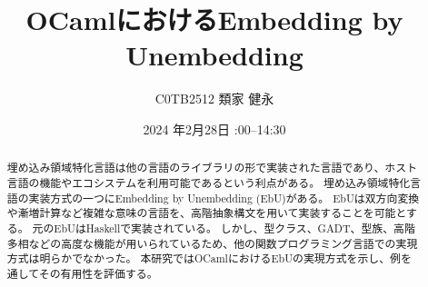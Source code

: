 \documentclass[uplatex]{sumiilab-paper}
\title{OCamlにおけるEmbedding by Unembedding}
\author{C0TB2512 類家 健永}
\institute{東北大学 工学部\\電気情報物理工学科}%
\date{2024 年2月28日 \quad 14:00--14:30}
\theoremstyle{mystyle}
\numberwithin{definition}{chapter} %
\begin{document}
\frontmatter%

\maketitle

\begin{abstract}
埋め込み領域特化言語は他の言語のライブラリの形で実装された言語であり、ホスト言語の機能やエコシステムを利用可能であるという利点がある。
埋め込み領域特化言語の実装方式の一つにEmbedding by Unembedding (EbU)がある。
EbUは双方向変換や漸増計算など複雑な意味の言語を、高階抽象構文を用いて実装することを可能とする。
元のEbUはHaskellで実装されている。
しかし、型クラス、GADT、型族、高階多相などの高度な機能が用いられているため、他の関数プログラミング言語での実現方式は明らかでなかった。
本研究ではOCamlにおけるEbUの実現方式を示し、例を通してその有用性を評価する。
\end{abstract}

\tableofcontents%

\mainmatter%
\end{document}
